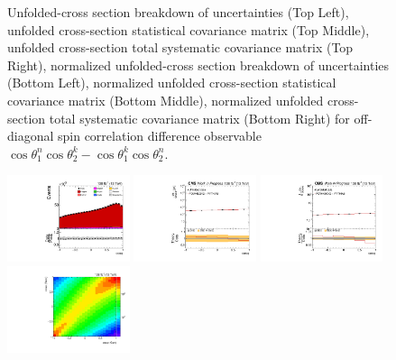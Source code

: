 \begin{figure}[htb]
\begin{center}
\caption{Unfolded-cross section breakdown of uncertainties (Top Left), unfolded cross-section statistical covariance matrix (Top Middle), unfolded cross-section total systematic covariance matrix (Top Right), normalized unfolded-cross section breakdown of uncertainties (Bottom Left), normalized unfolded cross-section statistical covariance matrix (Bottom Middle), normalized unfolded cross-section total systematic covariance matrix (Bottom Right) for off-diagonal spin correlation difference observable $\cos\theta_{1}^{n}\cos\theta_{2}^{k}-\cos\theta_{1}^{k}\cos\theta_{2}^{n}$.}
\label{fig:c_Mnk_uncertainties}
\end{center}
\end{figure}
\clearpage
\begin{figure}[htb]
\begin{center}
 \includegraphics[width=0.32\textwidth]{fig_fullRun2UL/controlplots/combined/Hyp_LLBarcHel.pdf}
 \includegraphics[width=0.32\textwidth]{fig_fullRun2UL/unfolding/combined/UnfoldedResults_ll_cHel.pdf}
 \includegraphics[width=0.32\textwidth]{fig_fullRun2UL/unfolding/combined/UnfoldedResultsNorm_ll_cHel.pdf} \\
 \includegraphics[width=0.32\textwidth]{fig_fullRun2UL/unfolding/combined/ResponseMatrix_ll_cHel.pdf}

\end{center}
\end{figure}
